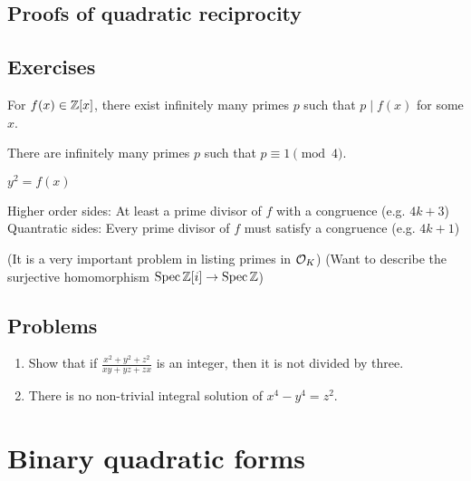 \documentclass{../../large}
\begin{document}
\section{Proofs of quadratic reciprocity}
\begin{prb}

\end{prb}

\section*{Exercises}
\begin{prb}
\begin{parts}
\item For $f(x)\in\mathbb{Z}[x]$, there exist infinitely many primes $p$ such that $p\mid f(x)$ for some $x$.
\item There are infinitely many primes $p$ such that $p\equiv1\pmod4$.
\end{parts}
\end{prb}

\begin{prb}
$y^2=f(x)$

Higher order sides: At least a prime divisor of $f$ with a congruence (e.g. $4k+3$)
Quantratic sides: Every prime divisor of $f$ must satisfy a congruence (e.g. $4k+1$)
\end{prb}


\begin{prb}
(It is a very important problem in listing primes in $\mathcal{O}_K$)
(Want to describe the surjective homomorphism $\operatorname{Spec}\mathbb{Z}[i]\to\operatorname{Spec}\mathbb{Z}$)
\end{prb}



\section*{Problems}

\begin{enumerate}
\item Show that if $\frac{x^2+y^2+z^2}{xy+yz+zx}$ is an integer, then it is not divided by three.
\item There is no non-trivial integral solution of $x^4-y^4=z^2$.
\end{enumerate}




\chapter{Binary quadratic forms}
\end{document}
